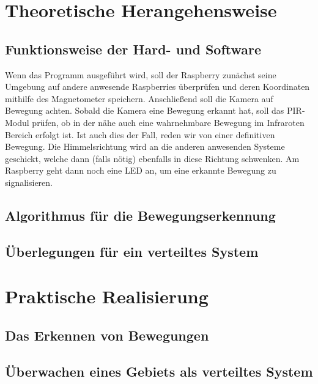 \documentclass[12pt,a4paper]{scrreprt}
\begin{document}
\chapter{Theoretische Herangehensweise}
\section{Funktionsweise der Hard- und Software}
Wenn das Programm ausgeführt wird, soll der Raspberry zunächst seine Umgebung auf andere anwesende Raspberries überprüfen und deren Koordinaten mithilfe des Magnetometer speichern. Anschließend soll die Kamera auf Bewegung achten. Sobald die Kamera eine Bewegung erkannt hat, soll das PIR-Modul prüfen, ob in der nähe auch eine wahrnehmbare Bewegung im Infraroten Bereich erfolgt ist. Ist auch dies der Fall, reden wir von einer definitiven Bewegung. Die Himmelsrichtung wird an die anderen anwesenden Systeme geschickt, welche dann (falls nötig) ebenfalls in diese Richtung schwenken. Am Raspberry geht dann noch eine LED an, um eine erkannte Bewegung zu signalisieren. 

\section{Algorithmus für die Bewegungserkennung}


\section{Überlegungen für ein verteiltes System}


\chapter{Praktische Realisierung}

\section{Das Erkennen von Bewegungen}


\section{Überwachen eines Gebiets als verteiltes System}
\end{document}

